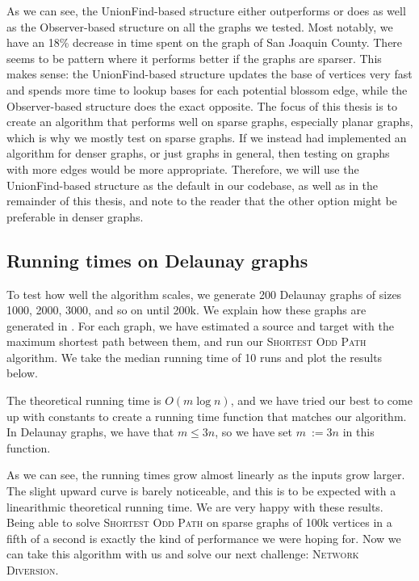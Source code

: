 As we can see, the UnionFind-based structure either outperforms or does as well as the Observer-based structure on all the graphs we tested. Most notably, we have an 18\% decrease in time spent on the graph of San Joaquin County. There seems to be pattern where it performs better if the graphs are sparser. This makes sense: the UnionFind-based structure updates the base of vertices very fast and spends more time to lookup bases for each potential blossom edge, while the Observer-based structure does the exact opposite. The focus of this thesis is to create an algorithm that performs well on sparse graphs, especially planar graphs, which is why we mostly test on sparse graphs. If we instead had implemented an algorithm for denser graphs, or just graphs in general, then testing on graphs with more edges would be more appropriate. Therefore, we will use the UnionFind-based structure as the default in our codebase, as well as in the remainder of this thesis, and note to the reader that the other option might be preferable in denser graphs.

\subsection{Running times on Delaunay graphs}
\label{subsubsection:odd-path-delaunay-testing}
To test how well the algorithm scales, we generate 200 Delaunay graphs of sizes 1000, 2000, 3000, and so on until 200k. We explain how these graphs are generated in . For each graph, we have estimated a source and target with the maximum shortest path between them, and run our \textsc{Shortest Odd Path} algorithm. We take the median running time of 10 runs and plot the results below.

The theoretical running time is $O(m \log n)$, and we have tried our best to come up with constants to create a running time function that matches our algorithm. In Delaunay graphs, we have that $m \leq 3n$, so we have set $m~:= 3n$ in this function.

\begin{center}
    
\end{center}

As we can see, the running times grow almost linearly as the inputs grow larger. The slight upward curve is barely noticeable, and this is to be expected with a linearithmic theoretical running time. We are very happy with these results. Being able to solve \textsc{Shortest Odd Path} on sparse graphs of 100k vertices in a fifth of a second is exactly the kind of performance we were hoping for. Now we can take this algorithm with us and solve our next challenge: \textsc{Network Diversion}.
